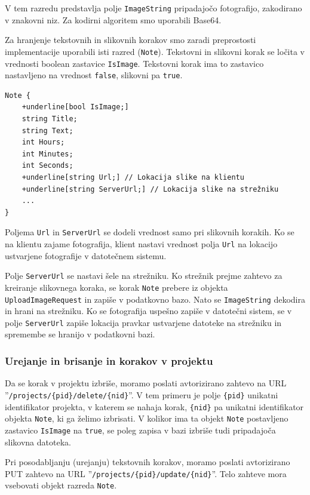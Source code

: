 \documentclass[a4paper, 12pt]{book}
\begin{document}
V tem razredu predstavlja polje \texttt{ImageString} pripadajočo fotografijo, zakodirano v znakovni niz.
Za kodirni algoritem smo uporabili Base64.

Za hranjenje tekstovnih in slikovnih korakov smo zaradi preprostosti implementacije uporabili isti razred (\texttt{Note}).
Tekstovni in slikovni korak se ločita v vrednosti boolean zastavice \texttt{IsImage}.
Tekstovni korak ima to zastavico nastavljeno na vrednost \texttt{false}, slikovni pa \texttt{true}.

\begin{Verbatim}[commandchars=+\[\]]
Note { 
    +underline[bool IsImage;]
    string Title; 
    string Text; 
    int Hours; 
    int Minutes;
    int Seconds; 
    +underline[string Url;] // Lokacija slike na klientu
    +underline[string ServerUrl;] // Lokacija slike na strežniku
    ... 
}
\end{Verbatim}

Poljema \texttt{Url} in \texttt{ServerUrl} se dodeli vrednost samo pri slikovnih korakih.
Ko se na klientu zajame fotografija, klient nastavi vrednost polja \texttt{Url} na lokacijo ustvarjene fotografije v datotečnem sistemu.

Polje \texttt{ServerUrl} se nastavi šele na strežniku.
Ko strežnik prejme zahtevo za kreiranje slikovnega koraka, se korak \texttt{Note} prebere iz objekta \texttt{UploadImageRequest} in zapiše v podatkovno bazo.
Nato se \texttt{ImageString} dekodira in hrani na strežniku.
Ko se fotografija uspešno zapiše v datotečni sistem, se v polje \texttt{ServerUrl} zapiše lokacija pravkar ustvarjene datoteke na strežniku in spremembe se hranijo v podatkovni bazi.

\subsubsection{Urejanje in brisanje in korakov v projektu}

Da se korak v projektu izbriše, moramo poslati avtorizirano zahtevo na URL ''\texttt{/projects/\{pid\}/delete/\{nid\}}''.
V tem primeru je polje \texttt{\{pid\}} unikatni identifikator projekta, v katerem se nahaja korak, \texttt{\{nid\}} pa unikatni identifikator objekta \texttt{Note}, ki ga želimo izbrisati.
V kolikor ima ta objekt \texttt{Note} postavljeno zastavico \texttt{IsImage} na \texttt{true}, se poleg zapisa v bazi izbriše tudi pripadajoča slikovna datoteka.

Pri posodabljanju (urejanju) tekstovnih korakov, moramo poslati avtorizirano PUT zahtevo na URL ''\texttt{/projects/\{pid\}/update/\{nid\}}''.
Telo zahteve mora vsebovati objekt razreda \texttt{Note}.
\end{document}

